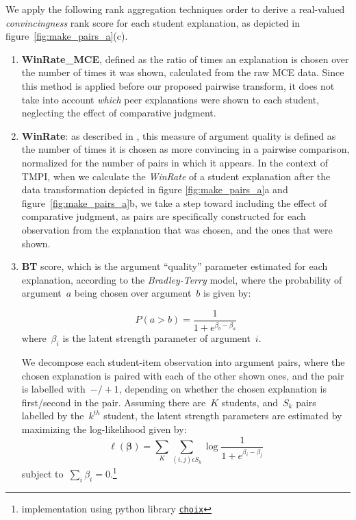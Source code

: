 \documentclass[notitlepage,12pt]{jedm}
\begin{document}
We apply the following rank aggregation techniques order to derive a real-valued \textit{convincingness} rank score for each student explanation, as 
depicted in figure~\ref{fig:make_pairs_a}(c).

\begin{enumerate}
	
	\item \textbf{WinRate\_MCE}, defined as the ratio of times an explanation 
	is chosen over the number of times it was shown, calculated from the raw MCE 
	data.
	Since this method is applied before our proposed pairwise transform, it 
	does not take into account \textit{which} peer explanations were shown to 
	each student, neglecting the effect of comparative judgment.
	
	\item \textbf{WinRate}: as described in , this 
	measure of argument quality is defined as the number of times it is chosen 
	as more convincing in a pairwise comparison, normalized for the number of
	pairs in which it appears. 
	In the context of TMPI, when we calculate the \textit{WinRate} of a student 
	explanation after the data transformation depicted in figure 
	\ref{fig:make_pairs_a}a and figure~\ref{fig:make_pairs_a}b, we take a step 
	toward including the effect of comparative judgment, as pairs are 
	specifically constructed for each observation from the explanation that was 
	chosen, and the ones that were shown.
	
	\item \textbf{BT} score, which is the argument ``quality'' parameter 
	estimated for each explanation, according to the \textit{Bradley-Terry} 
	model, where the probability of argument~$a$ being chosen over argument~$b$ 
	is given by:
	
	$$
	P(a>b) = 
	\frac{1}{1+e^{\beta_b-\beta_a}}
	$$
	where~$\beta_i$ is the latent strength parameter of argument~$i$.
	
	We decompose each student-item observation into argument pairs, where the 
	chosen explanation is paired with each of the other shown ones, and the 
	pair is labelled with~$-/+1$, depending on whether the chosen explanation 
	is first/second in the pair.
	Assuming there are~$K$ students, and~$S_k$ pairs labelled by the~$k^{th}$ 
	student, the latent strength parameters are estimated by maximizing 
	the log-likelihood given by:
	$$
	\ell(\boldsymbol{\beta})=\sum_{K}\sum_{(i,j)\epsilon S_k}^{} 
	\log\frac{1}{1+e^{\beta_i - \beta_j}}
	$$
	subject to~$\sum_{i}\beta_i=0$.\footnote{implementation using python 
	library 
	\href{http://choix.lum.li/en/latest/}{\texttt{choix}}}
	

\end{enumerate}
\end{document}
